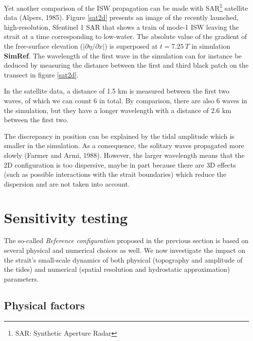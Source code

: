 \documentclass[a4paper,12pt]{article}
\begin{document}
Yet another comparison of the ISW propagation can be made with SAR\footnote{SAR: Synthetic Aperture Radar} satellite data (Alpers, 1985). Figure \ref{sat2d} presents an image of the recently launched, high-resolution, Sfentinel 1 SAR that shows a train of mode-1 ISW leaving the strait at a time corresponding to low-water. The absolute value of the gradient of the free-surface elevation ($\vert \partial \eta / \partial x \vert$) is superposed at $t = 7.25\ T$ in simulation \textbf{SimRef}. The wavelength of the first wave in the simulation can for instance be deduced by measuring the distance between the first and third black patch on the transect in figure \ref{sat2d}.\color{black}

In the satellite data, a distance of 1.5 km is measured between the first two waves, of which we can count 6 in total. By comparison, there are also 6 waves in the simulation, but they have a longer wavelength with a distance of 2.6 km between the first two.

The discrepancy in position can be explained by the tidal amplitude which is smaller in the simulation. As a consequence, the solitary waves propagated more slowly (Farmer and Armi, 1988). However, the larger wavelength means that the 2D configuration is too dispersive, maybe in part because there are 3D effects (such as possible interactions with the strait boundaries) which reduce the dispersion and are not taken into account.\\


\section{Sensitivity testing}
The so-called \textit{Reference configuration} proposed in the previous section is based on several physical and numerical choices as well. We now investigate the impact on the strait's small-scale dynamics of both physical (topography and amplitude of the tides) and numerical (spatial resolution and hydrostatic approximation) parameters. 

\subsection{Physical factors}
\label{TestPhy}


\end{document}

